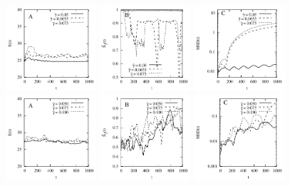 \documentclass[aps,prl,preprint,groupedaddress]{revtex4-2}
\begin{document}
\begin{figure}
  \begin{center}
  \includegraphics[width=0.3\textwidth]{VS_E.pdf}
   \includegraphics[width=0.3\textwidth]{VS_LOP.pdf}
    \includegraphics[width=0.3\textwidth]{VS_MSD.pdf}\\
      \includegraphics[width=0.3\textwidth]{BS_E.pdf}
   \includegraphics[width=0.3\textwidth]{BS_LOP.pdf}
    \includegraphics[width=0.3\textwidth]{BS_MSD.pdf}

\end{center}
\end{figure}
\end{document}
